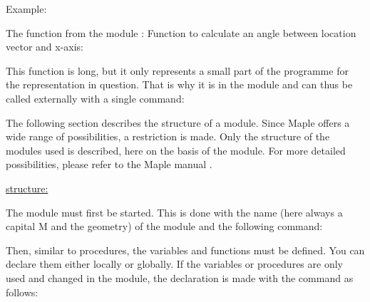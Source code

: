 Example:

The function  from the module : Function to calculate an angle between location vector and x-axis:

\begin{alltt}
\end{alltt}

This function is long, but it only represents a small part of the programme for the representation in question. That is why it is in the module and can thus be called externally with a single command: 

\medskip


\bigskip

The following section describes the structure of a module. Since Maple offers a wide range of possibilities, a restriction is made. Only the structure of the modules used is described, here on the basis of the module. For more detailed possibilities, please refer to the Maple manual \cite{Wat:2017a}.

\bigskip

\underline{structure:}

\bigskip

The module must first be started. This is done with the name (here always a capital M and the geometry) of the module and the following command:

\medskip


\medskip

Then, similar to procedures, the variables and functions must be defined. You can declare them either locally or globally. If the variables or procedures are only used and changed in the module, the declaration is made with the command  as follows:

\medskip

